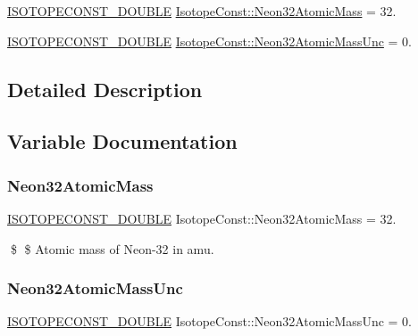 \begin{DoxyCompactItemize}
\item 
\mbox{\hyperlink{group___isotope_const-_macros_ga8f45a7272ce02c0b4c65c44636ed719a}{I\+S\+O\+T\+O\+P\+E\+C\+O\+N\+S\+T\+\_\+\+D\+O\+U\+B\+LE}} \mbox{\hyperlink{group___isotope_const-_neon-_ne32_gad07cc8e64c59ad0d98260ae3baaa0639}{Isotope\+Const\+::\+Neon32\+Atomic\+Mass}} = 32.
\item 
\mbox{\hyperlink{group___isotope_const-_macros_ga8f45a7272ce02c0b4c65c44636ed719a}{I\+S\+O\+T\+O\+P\+E\+C\+O\+N\+S\+T\+\_\+\+D\+O\+U\+B\+LE}} \mbox{\hyperlink{group___isotope_const-_neon-_ne32_ga58dee024819d81d6c5695c5293b3f3a2}{Isotope\+Const\+::\+Neon32\+Atomic\+Mass\+Unc}} = 0.
\end{DoxyCompactItemize}


\subsection{Detailed Description}


\subsection{Variable Documentation}
\mbox{\label{group___isotope_const-_neon-_ne32_gad07cc8e64c59ad0d98260ae3baaa0639}} 
\subsubsection{\texorpdfstring{Neon32\+Atomic\+Mass}{Neon32AtomicMass}}
{\footnotesize\ttfamily \mbox{\hyperlink{group___isotope_const-_macros_ga8f45a7272ce02c0b4c65c44636ed719a}{I\+S\+O\+T\+O\+P\+E\+C\+O\+N\+S\+T\+\_\+\+D\+O\+U\+B\+LE}} Isotope\+Const\+::\+Neon32\+Atomic\+Mass = 32.}

\$ \$ Atomic mass of Neon-\/32 in amu. \mbox{\label{group___isotope_const-_neon-_ne32_ga58dee024819d81d6c5695c5293b3f3a2}} 
\subsubsection{\texorpdfstring{Neon32\+Atomic\+Mass\+Unc}{Neon32AtomicMassUnc}}
{\footnotesize\ttfamily \mbox{\hyperlink{group___isotope_const-_macros_ga8f45a7272ce02c0b4c65c44636ed719a}{I\+S\+O\+T\+O\+P\+E\+C\+O\+N\+S\+T\+\_\+\+D\+O\+U\+B\+LE}} Isotope\+Const\+::\+Neon32\+Atomic\+Mass\+Unc = 0.}

